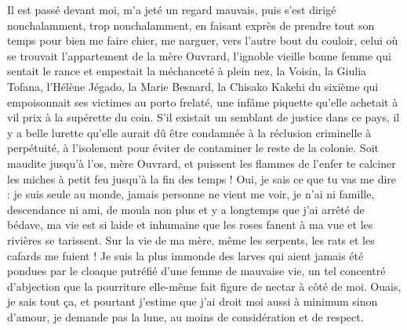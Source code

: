 Il est passé devant moi, m’a jeté un regard mauvais, puis s’est dirigé nonchalamment, trop nonchalamment, en faisant exprès de prendre tout son temps pour bien me faire chier, me narguer, vers l’autre bout du couloir, celui où se trouvait l’appartement de la mère Ouvrard, l’ignoble vieille bonne femme qui sentait le rance et empestait la méchanceté à plein nez, la Voisin, la Giulia Tofana, l’Hélène Jégado, la Marie Besnard, la Chisako Kakehi du sixième qui empoisonnait ses victimes au porto frelaté, une infâme piquette qu’elle achetait à vil prix à la supérette du coin. S’il existait un semblant de justice dans ce pays, il y a belle lurette qu’elle aurait dû être condamnée à la réclusion criminelle à perpétuité, à l’isolement pour éviter de contaminer le reste de la colonie. Soit maudite jusqu’à l’os, mère Ouvrard, et puissent les flammes de l’enfer te calciner les miches à petit feu jusqu’à la fin des temps ! Oui, je sais ce que tu vas me dire : je suis seule au monde, jamais personne ne vient me voir, je n’ai ni famille, descendance ni ami, de moula non plus et y a longtemps que j’ai arrêté de bédave, ma vie est si laide et inhumaine que les roses fanent à ma vue et les rivières se tarissent. Sur la vie de ma mère, même les serpents, les rats et les cafards me fuient ! Je suis la plus immonde des larves qui aient jamais été pondues par le cloaque putréfié d’une femme de mauvaise vie, un tel concentré d’abjection que la pourriture elle-même fait figure de nectar à côté de moi. Ouais, je sais tout ça, et pourtant j’estime que j’ai droit moi aussi à minimum sinon d’amour, je demande pas la lune, au moins de considération et de respect.


